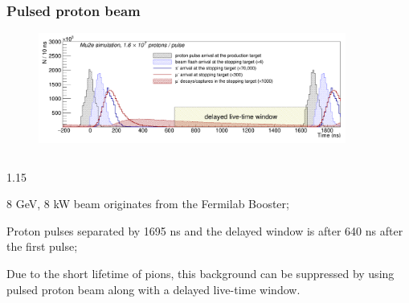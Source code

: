\documentclass{beamer}
\begin{document}
    \begin{frame}
        \frametitle{Pulsed proton beam}
        \vspace{-3mm}
    \begin{figure}[!h]
    \centering
    \includegraphics[width =0.9\textwidth]{figures/png/Screenshot_20240301_164649.png}
    \label{fig:beamwindow}
    \end{figure}
    \begin{columns}
        \begin{column}{1.15\framewidth}
        \setlength{\leftmargini}{1.1em}
       
           \begin{itemize}
          {\small     \item 8 GeV, 8 kW beam originates from the Fermilab Booster;
          \item Proton pulses separated by 1695 ns and the delayed window is after 640 ns after the first pulse;
          \item Due to the short lifetime of pions, this background can be suppressed by using pulsed
          proton beam along with a delayed live-time window.
          }
           \end{itemize}
       \end{column}
       \end{columns}
    \end{frame}
\end{document}
